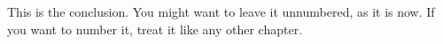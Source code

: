 This is the conclusion. You might want to leave it unnumbered, as it is now. If you want to number it, treat it like any other chapter.
